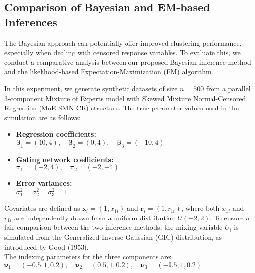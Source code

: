 \documentclass[10.5pt]{article} %
\begin{document}
\subsection{Comparison of Bayesian and EM-based Inferences}

The Bayesian approach can potentially offer improved clustering performance, especially when dealing with censored response variables. To evaluate this, we conduct a comparative analysis between our proposed Bayesian inference method and the likelihood-based Expectation-Maximization (EM) algorithm.

\noindent
In this experiment, we generate synthetic datasets of size \( n = 500 \) from a parallel 3-component Mixture of Experts model with Skewed Mixture Normal-Censored Regression (MoE-SMN-CR) structure. The true parameter values used in the simulation are as follows:

\begin{itemize}
    \item \textbf{Regression coefficients:} \\
    \( \boldsymbol{\beta}_1 = (10, 4), \quad \boldsymbol{\beta}_2 = (0, 4), \quad \boldsymbol{\beta}_3 = (-10, 4) \)
    
    \item \textbf{Gating network coefficients:} \\
    \( \boldsymbol{\tau}_1 = (-2, 4), \quad \boldsymbol{\tau}_2 = (-2, -4) \)
    
    \item \textbf{Error variances:} \\
    \( \sigma_1^2 = \sigma_2^2 = \sigma_3^2 = 1 \)
\end{itemize}

\noindent
Covariates are defined as \( \boldsymbol{x}_i = (1, x_{1i}) \) and \( \boldsymbol{r}_i = (1, r_{1i}) \), where both \( x_{1i} \) and \( r_{1i} \) are independently drawn from a uniform distribution \( U(-2, 2) \).
\noindent
To ensure a fair comparison between the two inference methods, the mixing variable \( U_i \) is simulated from the Generalized Inverse Gaussian (GIG) distribution, as introduced by Good (1953).\\

\noindent
The indexing parameters for the three components are:\\
\( \boldsymbol{\nu}_1 = (-0.5, 1, 0.2), \quad \boldsymbol{\nu}_2 = (0.5, 1, 0.2), \quad \boldsymbol{\nu}_3 = (-0.5, 1, 0.2) \)\\
\end{document}
